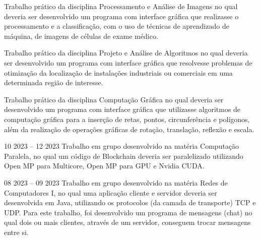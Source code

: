 Trabalho prático da disciplina Processamento e Análise de Imagens no qual deveria ser desenvolvido um programa com interface gráfica que realizasse o processamento e a classificação, com o uso de técnicas de aprendizado de máquina, de imagens de células de exame médico.\\
\divider

Trabalho prático da disciplina Projeto e Análise de Algoritmos no qual deveria ser desenvolvido um programa com interface gráfica que resolvesse problemas de otimização da localização de instalações industriais ou comerciais em uma determinada região de interesse.\\
\divider

Trabalho prático da disciplina Computação Gráfica no qual deveria ser desenvolvido um programa com interface gráfica que utilizasse algoritmos de computação gráfica para a inserção de retas, pontos, circunferência e polígonos, além da realização de operações gráficas de rotação, translação, reflexão e escala.\\
\divider

{
}{10 2023 -- 12 2023}{}
Trabalho em grupo desenvolvido na matéria Computação Paralela, no qual um código de Blockchain deveria ser paralelizado utilizando Open MP para Multicore, Open MP para GPU e Nvidia CUDA.\\
\divider

{
}{08 2023 -- 09 2023}{}
Trabalho em grupo desenvolvido na matéria Redes de Computadores I, no qual uma aplicação cliente e servidor deveria ser desenvolvida em Java, utilizando os protocolos (da camada de transporte) TCP e UDP. Para este trabalho, foi desenvolvido um programa de mensagens (chat) no qual dois ou mais clientes, através de um servidor, conseguem trocar mensagens entre si.\\
\divider
        
